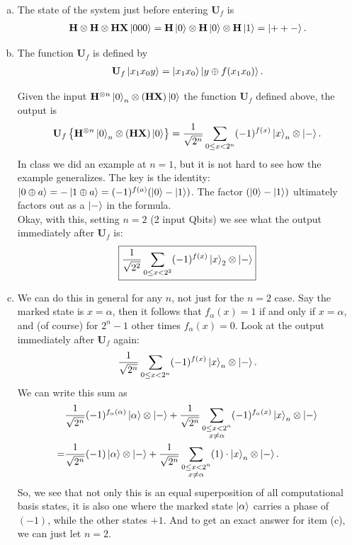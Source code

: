 \documentclass{book}
\theoremstyle{definition}
\newcommand{\nn}{\nonumber}
\newcommand{\al}{\alpha}
\newcommand{\X}{\mathbf{X}}
\newcommand{\f}[2]{\frac{#1}{#2}}
\newcommand{\lp}{\left(}
\newcommand{\rp}{\right)}
\newcommand{\lc}{\left\{}
\newcommand{\rc}{\right\}}
\newcommand{\U}{\mathbf{U}}
\newcommand{\had}{\mathbf{H}}
\begin{document}
\begin{enumerate}[(a)]
	\item The state of the system just before entering $\U_f$ is 
	\begin{align}
	 \had \otimes \had \otimes \had \X \ket{000} = \had \ket{0} \otimes \had \ket{0} \otimes \had\ket{1} = \ket{++-}.
	\end{align}
	
	
	\item The function $\U_f$ is defined by
	\begin{align}
	\U_f \ket{ x_1 x_0 y} = \ket{ x_1 x_0} \ket{ y \oplus f(x_1x_0)}.
	\end{align}
	
	Given the input $\had^{\otimes n} \ket{0}_n \otimes (\had \X)\ket{0}$ the function $\U_f$ defined above, the output is
	\begin{align}
	\U_f \lc \had^{\otimes n} \ket{0}_n \otimes (\had \X)\ket{0} \rc = \f{1}{\sqrt{2^n}}\sum_{0 \leq x < 2^n}(-1)^{f(x)} \ket{x}_n \otimes \ket{-}.
	\end{align}
	In class we did an example at $n=1$, but it is not hard to see how the example generalizes. The key is the identity: $\ket{ 0\oplus a } = - \ket{1 \oplus a} = (-1)^{f(a)}(\ket{0} - \ket{1}) $. The factor $\lp \ket{ 0} - \ket{1}\rp$ ultimately factors out as a $\ket{-}$ in the formula. \\
	
	Okay, with this, setting $n=2$ (2 input Qbits) we see what the output immediately after $\U_f$ is:
	\begin{align}
	\boxed{\f{1}{\sqrt{2^2}}\sum_{0 \leq x < 2^2}(-1)^{f(x)} \ket{x}_2 \otimes \ket{-}}
	\end{align}
	
	
	\item We can do this in general for any $n$, not just for the $n=2$ case. Say the marked state is $x = \al$, then it follows that $f_\al(x) = 1$ if and only if $x = \al$, and (of course) for $2^n-1$ other times $f_\al(x) = 0$. Look at the output immediately after $\U_f$ again:
	\begin{align}
	\f{1}{\sqrt{2^n}}\sum_{0 \leq x < 2^n}(-1)^{f(x)} \ket{x}_n \otimes \ket{-}.
	\end{align}
	We can write this sum as
	\begin{align}
	 &\f{1}{\sqrt{2^n}}(-1)^{f_\al(\al)}\ket{ \al}\otimes \ket{-} + \f{1}{\sqrt{2^n}}\sum_{\substack{{0 \leq x < 2^n}\\ {x\neq \al}}} (-1)^{f_\al(x)} \ket{x}_n \otimes \ket{-}\nn\\
	 =& \f{1}{\sqrt{2^n}} (-1)\ket{\al}\otimes \ket{-} + \f{1}{\sqrt{2^n}}\sum_{\substack{{0 \leq x < 2^n}\\ {x\neq \al}}} (1)\cdot \ket{x}_n   \otimes \ket{-}.
	\end{align}
	So, we see that not only this is an equal superposition of all computational basis states, it is also one where the marked state $\ket{\al}$ carries a phase of $(-1)$, while the other states $+1$. And to get an exact answer for item (c), we can just let $n=2$. 
	

\end{enumerate}
\end{document}

